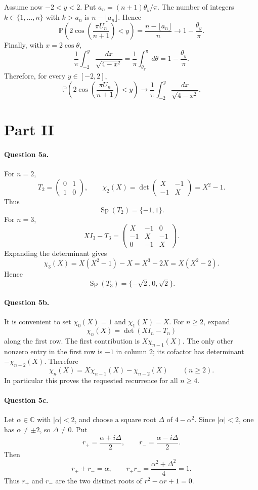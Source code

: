 \documentclass[11pt,a4paper]{article}
\newcommand{\C}{\mathbb{C}}
\newcommand{\Prob}{\mathbb{P}}
\DeclareMathOperator{\Sp}{Sp}
\begin{document}
Assume now $-2<y<2$.  Put $a_n=(n+1)\theta_y/\pi$.  The number of integers $k\in\{1,\dots,n\}$ with $k>a_n$ is $n-\lfloor a_n\rfloor$.  Hence
\[
  \Prob\left(2\cos\left(\frac{\pi U_n}{n+1}\right)<y\right)
  =\frac{n-\lfloor a_n\rfloor}{n}
  \longrightarrow 1-\frac{\theta_y}{\pi}.
\]
Finally, with $x=2\cos\theta$,
\[
  \frac1\pi\int_{-2}^y\frac{dx}{\sqrt{4-x^2}}
  =\frac1\pi\int_{\theta_y}^{\pi}d\theta
  =1-\frac{\theta_y}{\pi}.
\]
Therefore, for every $y\in[-2,2]$,
\[
  \boxed{
  \Prob\left(2\cos\left(\frac{\pi U_n}{n+1}\right)<y\right)
  \longrightarrow
  \frac1\pi\int_{-2}^y\frac{dx}{\sqrt{4-x^2}}.}
\]

\section{Part II}

\paragraph{Question 5a.}
For $n=2$,
\[
  T_2=\begin{pmatrix}0&1\\1&0\end{pmatrix},
  \qquad
  \chi_2(X)=\det\begin{pmatrix}X&-1\\-1&X\end{pmatrix}=X^2-1.
\]
Thus
\[
  \boxed{\Sp(T_2)=\{-1,1\}.}
\]
For $n=3$,
\[
  XI_3-T_3=\begin{pmatrix}
  X&-1&0\\
  -1&X&-1\\
  0&-1&X
  \end{pmatrix}.
\]
Expanding the determinant gives
\[
  \chi_3(X)=X(X^2-1)-X=X^3-2X=X(X^2-2).
\]
Hence
\[
  \boxed{\Sp(T_3)=\{-\sqrt2,0,\sqrt2\}.}
\]

\paragraph{Question 5b.}
It is convenient to set $\chi_0(X)=1$ and $\chi_1(X)=X$.  For $n\ge2$, expand
\[
  \chi_n(X)=\det(XI_n-T_n)
\]
along the first row.  The first contribution is $X\chi_{n-1}(X)$.  The only other nonzero entry in the first row is $-1$ in column $2$; its cofactor has determinant $-\chi_{n-2}(X)$.  Therefore
\[
  \boxed{\chi_n(X)=X\chi_{n-1}(X)-\chi_{n-2}(X)\qquad(n\ge2).}
\]
In particular this proves the requested recurrence for all $n\ge4$.

\paragraph{Question 5c.}
Let $\alpha\in\C$ with $|\alpha|<2$, and choose a square root $\Delta$ of $4-\alpha^2$.  Since $|\alpha|<2$, one has $\alpha\ne\pm2$, so $\Delta\ne0$.  Put
\[
  r_+=\frac{\alpha+i\Delta}{2},\qquad
  r_-=\frac{\alpha-i\Delta}{2}.
\]
Then
\[
  r_++r_-=\alpha,
  \qquad
  r_+r_-=\frac{\alpha^2+\Delta^2}{4}=1.
\]
Thus $r_+$ and $r_-$ are the two distinct roots of $r^2-\alpha r+1=0$.
\end{document}

